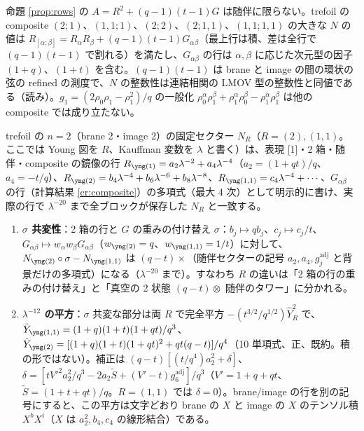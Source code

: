 \begin{compresult}\label{cr:composite}
命題 \ref{prop:rows} の $A = R^2 + (q-1)(t-1)G$ は随伴に限らない。trefoil の composite $(2;1)$、$(1,1;1)$、$(2;2)$、$(2;1,1)$、$(1,1;1,1)$ の大きな $N$ の値は
$R_{[\alpha;\beta]} = R_\alpha R_\beta + (q-1)(t-1)G_{\alpha\beta}$（最上行は積、差は全行で $(q-1)(t-1)$ で割れる）を満たし、$G_{\alpha\beta}$ の行は $\alpha, \beta$ に応じた次元型の因子 $(1+q)$、$(1+t)$ を含む。$(q-1)(t-1)$ は brane と image の間の環状の弦の refined の測度で、$N$ の整数性は連結相関の LMOV 型の整数性と同値である（読み）。$g_1 = (2\rho_0\rho_1 - \rho_1^2)/q$ の一般化 $\rho_0^\alpha\rho_1^\beta + \rho_1^\alpha\rho_0^\beta - \rho_1^\alpha\rho_1^\beta$ は他の composite では成り立たない。
\end{compresult}
\begin{compresult}[$n = 2$ の行の母関数と $R$ 依存性]\label{cr:n2rows}
trefoil の $n = 2$（brane 2・image 2）の固定セクター $N_R$（$R = (2), (1,1)$。ここでは Young 図を $R$、Kauffman 変数を $\lambda$ と書く）は、表現 [1]・2 箱・随伴・composite の鏡像の行 $R_{\yone} = a_2\lambda^{-2} + a_4\lambda^{-4}$（$a_2 = (1+qt)/q$、$a_4 = -t/q$）、$R_{\ytwo} = b_4\lambda^{-4} + b_6\lambda^{-6} + b_8\lambda^{-8}$、$R_{\yoneone} = c_4\lambda^{-4} + \cdots$、$G_{\alpha\beta}$ の行（計算結果 \ref{cr:composite}）の多項式（最大 4 次）として明示的に書け、実際の行で $\lambda^{-20}$ まで全ブロックが保存した $N_R$ と一致する。
\begin{enumerate}
\item \textbf{$\sigma$ 共変性}：2 箱の行と $G$ の重みの付け替え $\sigma$：$b_j \mapsto qb_j$、$c_j \mapsto c_j/t$、$G_{\alpha\beta} \mapsto w_\alpha w_\beta G_{\alpha\beta}$（$w_{\ytwo} = q$、$w_{\yoneone} = 1/t$）に対して、$N_{\ytwo}\circ\sigma - N_{\yoneone}$ は $(q-t)\times$（随伴セクターの記号 $a_2, a_4, g^{\mathrm{adj}}_j$ と背景だけの多項式）になる（$\lambda^{-20}$ まで）。すなわち $R$ の違いは「2 箱の行の重みの付け替え」と「真空の 2 状態 $(q-t)\otimes$ 随伴のタワー」に分かれる。
\item \textbf{$\lambda^{-12}$ の平方}：$\sigma$ 共変な部分は両 $R$ で完全平方 $-(t^{3/2}/q^{1/2})\hat Y_R^2$ で、$\hat Y_{\yoneone} = (1+q)(1+t)(1+qt)/q^3$、$\hat Y_{\ytwo} = [(1+q)(1+t)(1+qt)^2 + qt(q-t)]/q^4$（10 単項式、正、既約。積の形ではない）。補正は $(q-t)[(t/q^4)a_2^2 + \delta]$、$\delta = [tV'^2a_2^2/q^3 - 2a_2\tilde S + (V'-t)g^{\mathrm{adj}}_6]/q^3$（$V' = 1+q+qt$、$\tilde S = (1+t+qt)/q$。$R = (1,1)$ では $\delta = 0$）。brane/image の行を別の記号にすると、この平方は文字どおり brane の $X$ と image の $X$ のテンソル積 $X^bX^i$（$X$ は $a_2^2, b_4, c_4$ の線形結合）である。

\end{enumerate}
\end{compresult}
